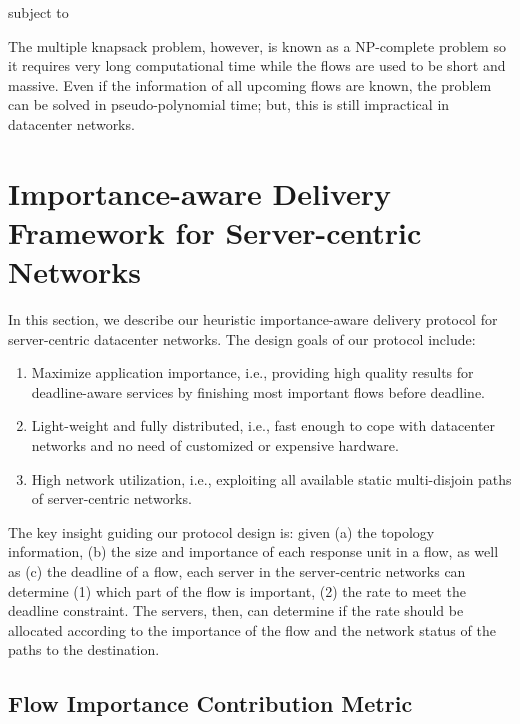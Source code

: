 \documentclass[conference]{IEEEtran}
\begin{document}
subject  to




The multiple knapsack problem, however, is known as a NP-complete problem\cite{reducibility} so it requires very long computational time while the flows are used to be short and massive. Even if the information of all upcoming flows are known, the problem can be solved in pseudo-polynomial time; but, this is still impractical in datacenter networks.

\section{Importance-aware Delivery Framework for
Server-centric Networks}

In this section, we describe our heuristic importance-aware delivery protocol for server-centric datacenter networks. The design goals of our protocol include:
\begin{enumerate}
\item Maximize application importance, i.e., providing high quality results for deadline-aware services by finishing most important flows before deadline.
\item Light-weight and fully distributed, i.e., fast enough to cope with datacenter networks and no need of customized or expensive hardware.
\item High network utilization, i.e., exploiting all available static multi-disjoin paths of server-centric networks.
\end{enumerate}
The key insight guiding our protocol design is: given (a) the topology information, (b) the size and importance of each response unit in a flow, as well as (c) the deadline of a flow, each server in the server-centric networks can determine (1) which part of the flow is important, (2) the rate to meet the deadline constraint. The servers, then, can determine if the rate should be allocated according to the importance of the flow and the network status of the paths to the destination.

\subsection{Flow Importance Contribution Metric}
\end{document}
